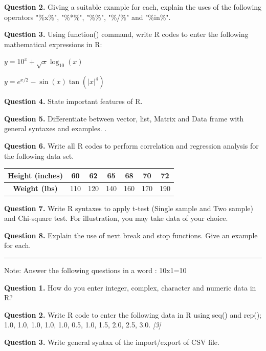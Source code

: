 \documentclass[11pt,a4paper]{article}
\newcommand{\pts}[1]{\hfill\textit{[#1]}}
\begin{document}
\medskip\noindent\textbf{Question 2.} Giving a suitable example for each, explain the uses
of the following operators
"\%x\%", "\%*\%", "\%\%", "\%/\%" and "\%in\%".

\medskip\noindent\textbf{Question 3.} Using function() command, write R codes to enter the following mathematical expressions in R:
\begin{parts}
  \item $y = 10^x + \sqrt{x}\log_{10}(x)$
  \item $y = e^{x/2} - \sin(x)\tan(|x|^4)$
\end{parts}

\medskip\noindent\textbf{Question 4.} State important features of R.

\medskip\noindent\textbf{Question 5.} Differentiate between vector, list, Matrix and Data
frame with general syntaxes and examples. .

\medskip\noindent\textbf{Question 6.} Write all R codes to perform correlation and
regression analysis for the following data set.

\begin{center}
\begin{tabular}{|c|c|c|c|c|c|c|}
\hline
\textbf{Height (inches)} & 60 & 62 & 65 & 68 & 70 & 72 \\ \hline
\textbf{Weight (lbs)} & 110 & 120 & 140 & 160 & 170 & 190 \\ \hline
\end{tabular}
\end{center}


\medskip\noindent\textbf{Question 7.} Write R syntaxes to apply t-test (Single sample and
Two sample) and Chi-square test. For illustration,
you may take data of your choice.

\medskip\noindent\textbf{Question 8.} Explain the use of next break and stop functions.
Give an example for each.

\bigskip{}
\rule{\linewidth}{0.4pt}\smallskip

Note: Answer the following questions in a word :
10x1=10

\medskip\noindent\textbf{Question 1.} How do you enter integer, complex, character and
numeric data in R?

\medskip\noindent\textbf{Question 2.} Write R code to enter the following data in R using
seq() and rep(); 1.0, 1.0, 1.0, 1.0, 1.0, 0.5, 1.0, 1.5, 2.0, 2.5, 3.0.
\pts{3}

\medskip\noindent\textbf{Question 3.} Write general syntax of the import/export of CSV
file.
\end{document}
